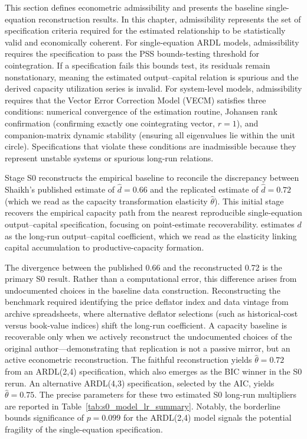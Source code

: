 \documentclass[11pt]{article}
\begin{document}
This section defines econometric admissibility and presents the baseline single-equation reconstruction results. In this chapter, admissibility represents the set of specification criteria required for the estimated relationship to be statistically valid and economically coherent. For single-equation ARDL models, admissibility requires the specification to pass the PSS bounds-testing threshold for cointegration. If a specification fails this bounds test, its residuals remain nonstationary, meaning the estimated output--capital relation is spurious and the derived capacity utilization series is invalid. For system-level models, admissibility requires that the Vector Error Correction Model (VECM) satisfies three conditions: numerical convergence of the estimation routine, Johansen rank confirmation (confirming exactly one cointegrating vector, $r=1$), and companion-matrix dynamic stability (ensuring all eigenvalues lie within the unit circle). Specifications that violate these conditions are inadmissible because they represent unstable systems or spurious long-run relations.

Stage S0 reconstructs the empirical baseline to reconcile the discrepancy between Shaikh's published estimate of $\hat{d}=0.66$ and the replicated estimate of $\hat{d}=0.72$ (which we read as the capacity transformation elasticity $\hat{\theta}$). This initial stage recovers the empirical capacity path from the nearest reproducible single-equation output--capital specification, focusing on point-estimate recoverability. \citet{Shaikh2016} estimates $d$ as the long-run output--capital coefficient, which we read as the elasticity linking capital accumulation to productive-capacity formation.

The divergence between the published 0.66 and the reconstructed 0.72 is the primary S0 result. Rather than a computational error, this difference arises from undocumented choices in the baseline data construction. Reconstructing the benchmark required identifying the price deflator index and data vintage from archive spreadsheets, where alternative deflator selections (such as historical-cost versus book-value indices) shift the long-run coefficient. A capacity baseline is recoverable only when we actively reconstruct the undocumented choices of the original author—demonstrating that replication is not a passive mirror, but an active econometric reconstruction. The faithful reconstruction yields $\hat{\theta}=0.72$ from an ARDL(2,4) specification, which also emerges as the BIC winner in the S0 rerun. An alternative ARDL(4,3) specification, selected by the AIC, yields $\hat{\theta}=0.75$. The precise parameters for these two estimated S0 long-run multipliers are reported in Table~\ref{tab:s0_model_lr_summary}. Notably, the borderline bounds significance of $p=0.099$ for the ARDL(2,4) model signals the potential fragility of the single-equation specification.
\end{document}
